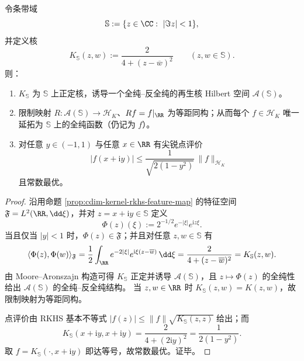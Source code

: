 \begin{proposition}[条带解析延拓与尖锐点评价常数]\label{prop:cdim-kernel-strip-extension-eval}
令条带域
\[
\mathbb S:=\{z\in\CC:\ |\Im z|<1\},
\]
并定义核
\[
K_{\mathbb S}(z,w):=\frac{2}{4+(z-\overline w)^2}\qquad(z,w\in\mathbb S).
\]
则：
\begin{enumerate}
  \item \(K_{\mathbb S}\) 为 \(\mathbb S\) 上正定核，诱导一个全纯--反全纯的再生核 Hilbert 空间 \(\mathcal A(\mathbb S)\)。
  \item 限制映射 \(R:\mathcal A(\mathbb S)\to\mathcal H_K\)、\(Rf=f|_{\RR}\) 为等距同构；从而每个 \(f\in\mathcal H_K\) 唯一延拓为 \(\mathbb S\) 上的全纯函数（仍记为 \(f\)）。
  \item 对任意 \(y\in(-1,1)\) 与任意 \(x\in\RR\) 有尖锐点评价
  \[
  \boxed{\;
  |f(x+\mathrm{i}y)|\le \frac{1}{\sqrt{2(1-y^2)}}\,\|f\|_{\mathcal H_K}\;}
  \]
  且常数最优。
\end{enumerate}
\end{proposition}
\begin{proof}
沿用命题 \ref{prop:cdim-kernel-rkhs-feature-map} 的特征空间 \(\mathfrak F=L^2(\RR,\dd\xi)\)，并对 \(z=x+\mathrm{i}y\in\mathbb S\) 定义
\[
\Phi(z)(\xi):=2^{-1/2}e^{-|\xi|}e^{\mathrm{i}z\xi}.
\]
当且仅当 \(|y|<1\) 时，\(\Phi(z)\in \mathfrak F\)；并且对任意 \(z,w\in\mathbb S\) 有
\[
\langle \Phi(z),\Phi(w)\rangle_{\mathfrak F}
=\frac12\int_{\RR}e^{-2|\xi|}e^{\mathrm{i}\xi(z-\overline w)}\,\dd\xi
=\frac{2}{4+(z-\overline w)^2}
=K_{\mathbb S}(z,w).
\]
由 Moore--Aronszajn 构造可得 \(K_{\mathbb S}\) 正定并诱导 \(\mathcal A(\mathbb S)\)，且 \(z\mapsto\Phi(z)\) 的全纯性给出 \(\mathcal A(\mathbb S)\) 的全纯--反全纯结构。
当 \(z,w\in\RR\) 时 \(K_{\mathbb S}(z,w)=K(z,w)\)，故限制映射为等距同构。
\par
点评价由 RKHS 基本不等式 \(|f(z)|\le \|f\|\sqrt{K_{\mathbb S}(z,z)}\) 给出；而
\[
K_{\mathbb S}(x+\mathrm{i}y,x+\mathrm{i}y)
=\frac{2}{4+(2\mathrm{i}y)^2}
=\frac{1}{2(1-y^2)}.
\]
取 \(f=K_{\mathbb S}(\cdot,x+\mathrm{i}y)\) 即达等号，故常数最优。证毕。
\end{proof}

